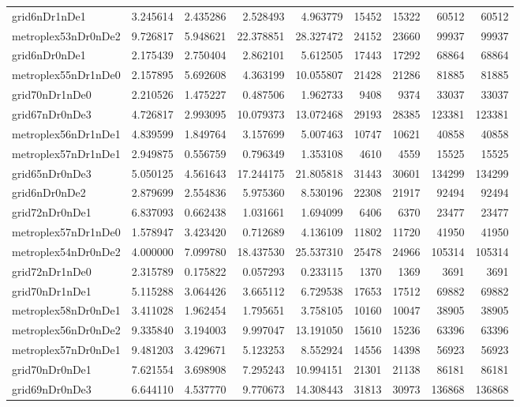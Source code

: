 \begin{longtable}{|l|r|r|r|r|r|r|r|r|}
grid6nDr1nDe1 & 3.245614 & 2.435286 & 2.528493 & 4.963779 & 15452 & 15322 & 60512 & 60512 \\
metroplex53nDr0nDe2 & 9.726817 & 5.948621 & 22.378851 & 28.327472 & 24152 & 23660 & 99937 & 99937 \\
grid6nDr0nDe1 & 2.175439 & 2.750404 & 2.862101 & 5.612505 & 17443 & 17292 & 68864 & 68864 \\
metroplex55nDr1nDe0 & 2.157895 & 5.692608 & 4.363199 & 10.055807 & 21428 & 21286 & 81885 & 81885 \\
grid70nDr1nDe0 & 2.210526 & 1.475227 & 0.487506 & 1.962733 & 9408 & 9374 & 33037 & 33037 \\
grid67nDr0nDe3 & 4.726817 & 2.993095 & 10.079373 & 13.072468 & 29193 & 28385 & 123381 & 123381 \\
metroplex56nDr1nDe1 & 4.839599 & 1.849764 & 3.157699 & 5.007463 & 10747 & 10621 & 40858 & 40858 \\
metroplex57nDr1nDe1 & 2.949875 & 0.556759 & 0.796349 & 1.353108 & 4610 & 4559 & 15525 & 15525 \\
grid65nDr0nDe3 & 5.050125 & 4.561643 & 17.244175 & 21.805818 & 31443 & 30601 & 134299 & 134299 \\
grid6nDr0nDe2 & 2.879699 & 2.554836 & 5.975360 & 8.530196 & 22308 & 21917 & 92494 & 92494 \\
grid72nDr0nDe1 & 6.837093 & 0.662438 & 1.031661 & 1.694099 & 6406 & 6370 & 23477 & 23477 \\
metroplex57nDr1nDe0 & 1.578947 & 3.423420 & 0.712689 & 4.136109 & 11802 & 11720 & 41950 & 41950 \\
metroplex54nDr0nDe2 & 4.000000 & 7.099780 & 18.437530 & 25.537310 & 25478 & 24966 & 105314 & 105314 \\
grid72nDr1nDe0 & 2.315789 & 0.175822 & 0.057293 & 0.233115 & 1370 & 1369 & 3691 & 3691 \\
grid70nDr1nDe1 & 5.115288 & 3.064426 & 3.665112 & 6.729538 & 17653 & 17512 & 69882 & 69882 \\
metroplex58nDr0nDe1 & 3.411028 & 1.962454 & 1.795651 & 3.758105 & 10160 & 10047 & 38905 & 38905 \\
metroplex56nDr0nDe2 & 9.335840 & 3.194003 & 9.997047 & 13.191050 & 15610 & 15236 & 63396 & 63396 \\
metroplex57nDr0nDe1 & 9.481203 & 3.429671 & 5.123253 & 8.552924 & 14556 & 14398 & 56923 & 56923 \\
grid70nDr0nDe1 & 7.621554 & 3.698908 & 7.295243 & 10.994151 & 21301 & 21138 & 86181 & 86181 \\
grid69nDr0nDe3 & 6.644110 & 4.537770 & 9.770673 & 14.308443 & 31813 & 30973 & 136868 & 136868 \\

\end{longtable}
